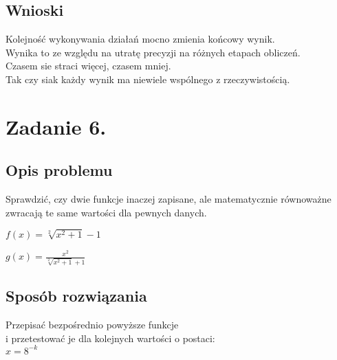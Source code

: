 \documentclass[12pt]{article}
\begin{document}
\subsection{Wnioski}
Kolejność wykonywania działań mocno zmienia końcowy wynik.\\
Wynika to ze względu na utratę precyzji na różnych etapach obliczeń.\\
Czasem sie straci więcej, czasem mniej. \\
Tak czy siak każdy wynik ma niewiele wspólnego
z rzeczywistością.
\section{Zadanie 6.}

\subsection{Opis problemu}
Sprawdzić, czy dwie funkcje inaczej zapisane, ale matematycznie równoważne\\
 zwracają te same wartości dla pewnych danych.
\begin{center}
   $f(x) = \sqrt[2]{{x^{2}} + 1} - 1$\\
\end{center}
\begin{center}
    $g(x) = \frac{{x^{2}}}{\sqrt[2]{{x^{2}} + 1} + 1}$
\end{center}
\subsection{Sposób rozwiązania}
Przepisać bezpośrednio powyższe funkcje \\
i przetestować je dla kolejnych wartości o postaci:\\
$ x = {8^{-k}}$
\end{document}
